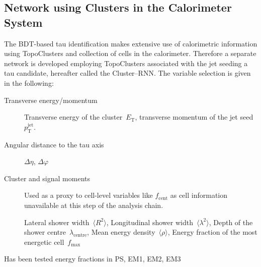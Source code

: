 
\subsection{Network using Clusters in the Calorimeter System}
\label{sec:rnn_clusters}

The BDT-based tau identification makes extensive use of calorimetric information
using TopoClusters and collection of cells in the calorimeter. Therefore a
separate network is developed employing TopoClusters associated with the jet
seeding a tau candidate, hereafter called the Cluster--RNN. The variable
selection is given in the following:
\begin{description}
\item[Transverse energy/momentum] Transverse energy of the
  cluster~$E_\text{T}$, transverse momentum of the jet
  seed~$p_\text{T}^\text{jet}$.
\item[Angular distance to the tau axis] $\Delta \eta$, $\Delta \varphi$
\item[Cluster and signal moments] Used as a proxy to cell-level variables like
  $f_\text{cent}$ as cell information unavailable at this step of the analysis
  chain.

  Lateral shower width~$\langle R^2 \rangle$,
  Longitudinal shower width~$\langle \lambda^2 \rangle$,
  Depth of the shower centre~$\lambda_\text{centre}$,
  Mean energy density~$\langle \rho \rangle$,
  Energy fraction of the most energetic cell~$f_\text{max}$~\cite{atlas_topoclustering}
\end{description}
Has been tested energy fractions in PS, EM1, EM2, EM3


